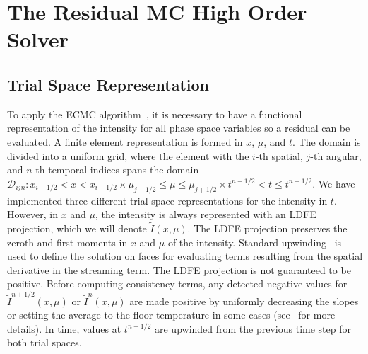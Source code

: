 \documentclass{anstrans}
\newcommand{\il}{{i-1/2}}
\newcommand{\ir}{{i+1/2}}
\newcommand{\jl}{{j-1/2}}
\newcommand{\jr}{{j+1/2}}
\begin{document}
\section{The Residual MC High Order Solver}
\label{sec:ho}

\subsection{Trial Space Representation}

To apply the ECMC algorithm~\cite{jake,bolding_nse}, it is necessary to have a functional representation
of the intensity for all phase space variables so a residual can be evaluated.
A finite element representation is formed in $x$,
$\mu$, and $t$.  The domain is divided
into a uniform grid, where the element with the $i$-th spatial, $j$-th angular, and $n$-th temporal
indices spans the domain 
$\mathcal{D}_{ijn}: x_\il <  x < x_\ir \times \mu_\jl \leq \mu \leq \mu_\jr \times t^{n-1/2} < t 
\leq t^{n+1/2}$.
We have implemented three different trial space representations for the intensity in $t$.
However, in $x$ and $\mu$, the intensity is always represented with an
LDFE projection, which we will denote $\tilde I(x,\mu)$. 
The LDFE projection preserves the zeroth and first moments in $x$ and $\mu$ of the intensity.  
Standard upwinding~\cite{morel_ldtrt,bolding_nse} is used to define the solution on faces for evaluating terms resulting
from the spatial derivative in the streaming term.  The LDFE projection is not guaranteed to be
positive.  Before computing consistency terms, any detected negative values for $\tilde I^{n+1/2}(x,\mu)$ or $\tilde
I^{n}(x,\mu)$ are made positive by uniformly decreasing the slopes or setting the average to the
floor temperature in some cases (see~\cite{dissertation} for more details). 
In time, values at
$t^{n-1/2}$ are upwinded from the previous time step for both trial spaces.
\end{document}

